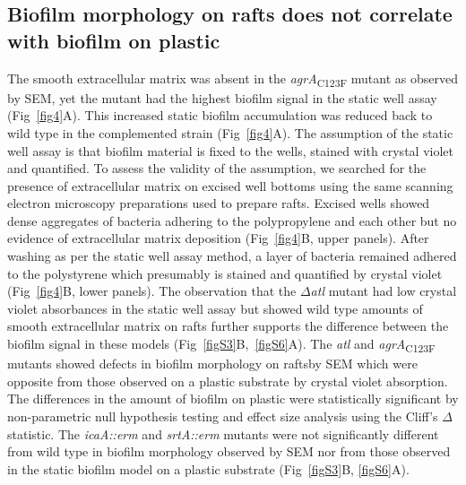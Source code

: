 \documentclass[10pt,letterpaper]{article}
\begin{document}
\subsection*{Biofilm morphology on rafts does not correlate with biofilm on plastic}

The smooth extracellular matrix was absent in the \textit{agrA}\textsubscript{C123F} mutant as observed by SEM, yet the mutant had the highest biofilm signal in the static well assay (Fig~\ref{fig4}A).
This increased static biofilm accumulation was reduced back to wild type in the complemented strain (Fig~\ref{fig4}A).
The assumption of the static well assay is that biofilm material is fixed to the wells, stained with crystal violet and quantified.
To assess the validity of the assumption, we searched for the presence of extracellular matrix on excised well bottoms using the same scanning electron microscopy preparations used to prepare rafts.
Excised wells showed dense aggregates of bacteria adhering to the polypropylene and each other but no evidence of extracellular matrix deposition (Fig~\ref{fig4}B, upper panels).
After washing as per the static well assay method, a layer of bacteria remained adhered to the polystyrene which presumably is stained and quantified by crystal violet (Fig~\ref{fig4}B, lower panels).
The observation that the $\Delta$\textit{atl} mutant had low crystal violet absorbances in the static well assay but showed wild type amounts of smooth extracellular matrix on rafts further supports the difference between the biofilm signal in these models (Fig~\ref{figS3}B,~\ref{figS6}A).
The \textit{atl} and \textit{agrA}\textsubscript{C123F} mutants showed defects in biofilm morphology on raftsby SEM which were opposite from those observed on a plastic substrate by crystal violet absorption.
The differences in the amount of biofilm on plastic were statistically significant by non-parametric null hypothesis testing and effect size analysis using the Cliff's $\Delta$ statistic.
The \textit{icaA::erm} and \textit{srtA::erm} mutants were not significantly different from wild type in biofilm morphology observed by SEM nor from those observed in the static biofilm model on a plastic substrate (Fig~\ref{figS3}B, \ref{figS6}A).
\end{document}
